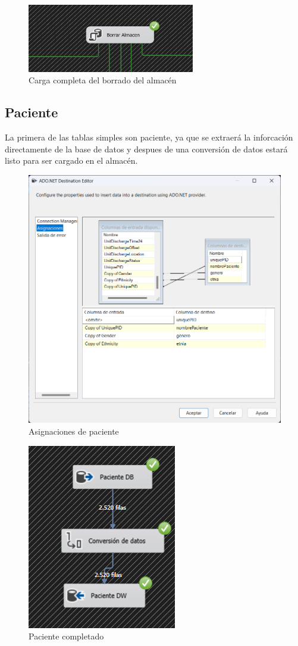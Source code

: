 \documentclass{article}
\begin{document}
	\begin{figure}[H]
		\begin{center} 
			\includegraphics[width=0.65\textwidth]{images/completados/borrado_almacen.png}
			\caption{Carga completa del borrado del almacén}
			\label{fig:borrado_completo}
		\end{center}
	\end{figure}
	
	\subsection{Paciente}
	La primera de las tablas simples son paciente, ya que se extraerá la inforcación directamente de la base de datos y despues de una conversión de datos estará listo para ser cargado en el almacén.
	\begin{figure}[H]
		\centering
		\includegraphics[width=.7\linewidth]{./images/asignaciones/paciente.png}
		\caption{Asignaciones de paciente}
	\end{figure}
	\begin{figure}[H]
		\centering
		\includegraphics[width=.3\linewidth]{./images/completados/paciente.png}
		\caption{Paciente completado}
	\end{figure}
\end{document}

